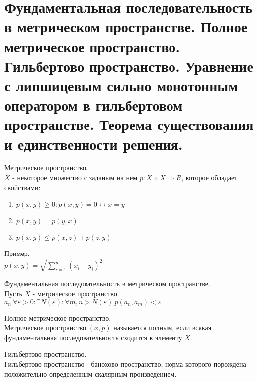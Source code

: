 \documentclass[__main__.tex]{subfiles}
\begin{document}
\section{Фундаментальная последовательность в метрическом пространстве. Полное метрическое пространство. Гильбертово пространство. Уравнение с липшицевым сильно монотонным оператором в гильбертовом пространстве. Теорема существования и единственности решения.}

\begin{definition}
    Метрическое пространство.\\
    $X$ - некоторое множество с заданым на нем $p: X \times X \Rightarrow R $, которое обладает свойствами:\\
    \begin{enumerate}
        \item $p(x,y) \geq 0 : p(x,y) = 0 \leftrightarrow x=y$
        \item $p(x,y) = p(y,x)$
        \item $p(x,y) \leq p(x,z) + p(z,y)$
    \end{enumerate}
    Пример.\\
    $p(x,y) = \sqrt{\sum_{i=1}^n (x_i - y_i)^2}$
\end{definition}

\begin{definition}
    Фундаментальная последовательность в метрическом пространстве.\\
    Пусть $X$ - метрическое пространство\\
    $a_n \ \forall \varepsilon > 0 : \exists N(\varepsilon) : \forall m,n > N(\varepsilon) \ p(a_n,a_m)< \varepsilon$
\end{definition}

\begin{definition}
    Полное метрическое пространство.\\
    Метрическое пространство $(x,p)$ называется полным, если всякая фундаментальная последовательность сходится к элементу $X$.
\end{definition}

\begin{definition}
    Гильбертово пространство.\\
    Гильбертово пространство - банохово пространство, норма которого порождена положительно определенным скалярным произведением.
\end{definition}
\end{document}

